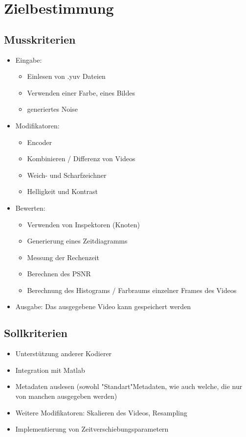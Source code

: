 \section{Zielbestimmung}

\subsection{Musskriterien}

\begin{itemize}
	\item Eingabe: 
	\begin{itemize}
		\item Einlesen von .yuv Dateien
		\item Verwenden einer Farbe, eines Bildes
		\item generiertes Noise
	\end{itemize}
	\item Modifikatoren:
	\begin{itemize}
		\item Encoder
		\item Kombinieren / Differenz von Videos
		\item Weich- und Scharfzeichner
		\item Helligkeit und Kontrast
	\end{itemize}
	\item Bewerten:
	\begin{itemize}
		\item Verwenden von Inspektoren (Knoten)
		\item Generierung eines Zeitdiagramms
		\item Messung der Rechenzeit
		\item Berechnen des PSNR
		\item Berechnung des Histograms / Farbraums einzelner Frames des Videos
	\end{itemize}
	\item Ausgabe: Das ausgegebene Video kann gespeichert werden
\end{itemize}

\subsection{Sollkriterien}

\begin{itemize}
	\item Unterstützung anderer Kodierer
	\item Integration mit Matlab
	\item Metadaten auslesen (sowohl "Standart"Metadaten, wie auch welche, die nur von manchen ausgegeben werden)
	\item Weitere Modifikatoren: Skalieren des Videos, Resampling
	\item Implementierung von Zeitverschiebungsparametern
\end{itemize}

